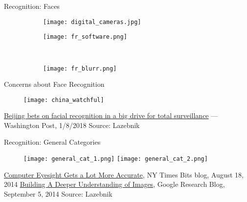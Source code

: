 \begin{frame}{Recognition: Faces}
    \begin{figure}[ht]
      \centering
      \begin{subfigure}[b]{0.45\linewidth}
        \centering\texttt{[image: digital\_cameras.jpg]}
        \caption{}\label{sf:digital_cameras}
      \end{subfigure}%
      \begin{subfigure}[b]{0.45\linewidth}
        \centering\texttt{[image: fr\_software.png]}
        \caption{}\label{sf:fr_software}
      \end{subfigure}\\
      \begin{subfigure}[b]{0.45\linewidth}
        \centering\texttt{[image: fr\_blurr.png]}
        \caption{}\label{sf:fr_blurr}
      \end{subfigure}
      \caption{}
    \end{figure}
\end{frame}



\begin{frame}{Concerns about Face Recognition}
    \begin{figure}[ht]
        \centering
        \texttt{[image: china\_watchful]}
    \end{figure}
    \href{https://www.washingtonpost.com/news/world/wp/2018/01/07/feature/in-china-facial-recognition-is-sharp-end-of-a-drive-for-total-surveillance/?noredirect=on\&utm\_term=.152c95a75d69}{Beijing bets on facial recognition in a big drive for total surveillance} --- Washington Post, 1/8/2018
    \vfill
    \scriptsize{Source: Lazebnik}
\end{frame}

\begin{frame}{Recognition: General Categories}
    \begin{figure}[ht]
        \centering
        \texttt{[image: general\_cat\_1.png]}
        \texttt{[image: general\_cat\_2.png]}
    \end{figure}
    \href{https://bits.blogs.nytimes.com/2014/08/18/computer-eyesight-gets-a-lot-more-accurate/}{Computer Eyesight Gets a Lot More Accurate}, NY Times Bits blog, August 18, 2014
    \href{https://ai.googleblog.com/2014/09/building-deeper-understanding-of-images.html}{Building A Deeper Understanding of Images}, Google Research Blog, September 5, 2014
    \vfill
    \scriptsize{Source: Lazebnik}
\end{frame}


